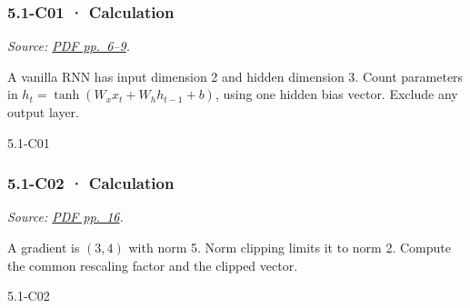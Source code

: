 \noindent\begin{minipage}{\linewidth}

\subsubsection{5.1-C01 · Calculation}\label{c01-calculation-12}

\emph{Source:
\href{../Lecture\%20Slides/5.1.\%20Sequence\%20Models.pdf\#page=6}{PDF
pp.~6--9}.}

A vanilla RNN has input dimension 2 and hidden dimension 3. Count
parameters in \(h_t=\tanh(W_xx_t+W_hh_{t-1}+b)\), using one hidden bias
vector. Exclude any output layer.

\begin{solution}[26mm]{5.1-C01}

\end{solution}
\end{minipage}\par\medskip

\noindent\begin{minipage}{\linewidth}

\subsubsection{5.1-C02 · Calculation}\label{c02-calculation-12}

\emph{Source:
\href{../Lecture\%20Slides/5.1.\%20Sequence\%20Models.pdf\#page=16}{PDF
pp.~16}.}

A gradient is \((3,4)\) with norm 5. Norm clipping limits it to norm 2.
Compute the common rescaling factor and the clipped vector.

\begin{solution}[26mm]{5.1-C02}

\end{solution}
\end{minipage}\par\medskip

